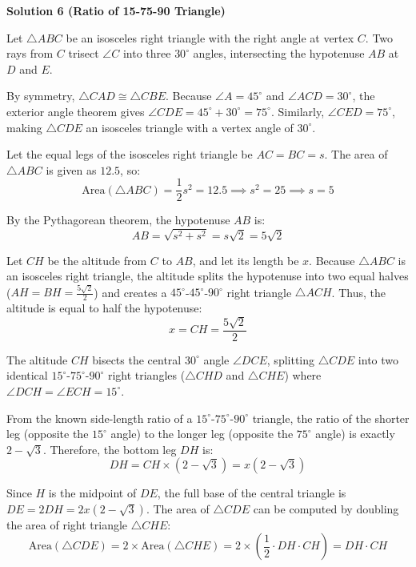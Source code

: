\begin{enumerate}
 



\textbf{Solution 6 (Ratio of 15-75-90 Triangle)}

Let $\triangle ABC$ be an isosceles right triangle with the right angle at vertex $C$. Two rays from $C$ trisect $\angle C$ into three $30^\circ$ angles, intersecting the hypotenuse $AB$ at $D$ and $E$. 

 By symmetry, $\triangle CAD \cong \triangle CBE$. Because $\angle A = 45^\circ$ and $\angle ACD = 30^\circ$, the exterior angle theorem gives $\angle CDE = 45^\circ + 30^\circ = 75^\circ$. Similarly, $\angle CED = 75^\circ$, making $\triangle CDE$ an isosceles triangle with a vertex angle of $30^\circ$.

 Let the equal legs of the isosceles right triangle be $AC = BC = s$. The area of $\triangle ABC$ is given as $12.5$, so:
 \[\text{Area}(\triangle ABC) = \frac{1}{2}s^2 = 12.5 \implies s^2 = 25 \implies s = 5\]

 By the Pythagorean theorem, the hypotenuse $AB$ is:
 \[AB = \sqrt{s^2 + s^2} = s\sqrt{2} = 5\sqrt{2}\]

 Let $CH$ be the altitude from $C$ to $AB$, and let its length be $x$. Because $\triangle ABC$ is an isosceles right triangle, the altitude splits the hypotenuse into two equal halves ($AH = BH = \frac{5\sqrt{2}}{2}$) and creates a $45^\circ$-$45^\circ$-$90^\circ$ right triangle $\triangle ACH$. Thus, the altitude is equal to half the hypotenuse:
 \[x = CH = \frac{5\sqrt{2}}{2}\]

 The altitude $CH$ bisects the central $30^\circ$ angle $\angle DCE$, splitting $\triangle CDE$ into two identical $15^\circ$-$75^\circ$-$90^\circ$ right triangles ($\triangle CHD$ and $\triangle CHE$) where $\angle DCH = \angle ECH = 15^\circ$. 

 From the known side-length ratio of a $15^\circ$-$75^\circ$-$90^\circ$ triangle, the ratio of the shorter leg (opposite the $15^\circ$ angle) to the longer leg (opposite the $75^\circ$ angle) is exactly $2 - \sqrt{3}$. Therefore, the bottom leg $DH$ is:
 \[DH = CH \times (2 - \sqrt{3}) = x(2 - \sqrt{3})\]

 Since $H$ is the midpoint of $DE$, the full base of the central triangle is $DE = 2DH = 2x(2 - \sqrt{3})$. The area of $\triangle CDE$ can be computed by doubling the area of right triangle $\triangle CHE$:
 \[\text{Area}(\triangle CDE) = 2 \times \text{Area}(\triangle CHE) = 2 \times \left( \frac{1}{2} \cdot DH \cdot CH \right) = DH \cdot CH\]


\end{enumerate}
